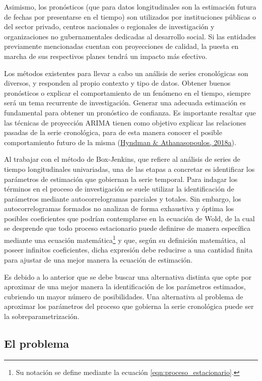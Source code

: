 \documentclass[
]{article}
\begin{document}
Asimismo, los pronósticos (que para datos longitudinales son la
estimación futura de fechas por presentarse en el tiempo) son utilizados
por instituciones públicas o del sector privado, centros nacionales o
regionales de investigación y organizaciones no gubernamentales
dedicadas al desarrollo social. Si las entidades previamente mencionadas
cuentan con proyecciones de calidad, la puesta en marcha de sus
respectivos planes tendrá un impacto más efectivo.

Los métodos existentes para llevar a cabo un análisis de series
cronológicas son diversos, y responden al propio contexto y tipo de
datos. Obtener buenos pronósticos o explicar el comportamiento de un
fenómeno en el tiempo, siempre será un tema recurrente de investigación.
Generar una adecuada estimación es fundamental para obtener un
pronóstico de confianza. Es importante resaltar que las técnicas de
proyección ARIMA tienen como objetivo explicar las relaciones pasadas de
la serie cronológica, para de esta manera conocer el posible
comportamiento futuro de la misma
(\protect\hyperlink{ref-hyndman2018forecasting}{Hyndman \&
Athanasopoulos, 2018a}).

Al trabajar con el método de Box-Jenkins, que refiere al análisis de
series de tiempo longitudinales univariadas, una de las etapas a
concretar es identificar los parámetros de estimación que gobiernan la
serie temporal. Para indagar los términos en el proceso de investigación
se suele utilizar la identificación de parámetros mediante
autocorrelogramas parciales y totales. Sin embargo, los
autocorrelogramas formados no analizan de forma exhaustiva y óptima los
posibles coeficientes que podrían contemplarse en la ecuación de Wold,
de la cual se desprende que todo proceso estacionario puede definirse de
manera específica mediante una ecuación matemática\footnote{Su notación
  se define mediante la ecuación \ref{eqn:proceso_estacionario}.} y que,
según su definición matemática, al poseer infinitos coeficientes, dicha
expresión debe reducirse a una cantidad finita para ajustar de una mejor
manera la ecuación de estimación.

Es debido a lo anterior que se debe buscar una alternativa distinta que
opte por aproximar de una mejor manera la identificación de los
parámetros estimados, cubriendo un mayor número de posibilidades. Una
alternativa al problema de aproximar los parámetros del proceso que
gobierna la serie cronológica puede ser la sobreparametrización.

\subsection{El problema}
\end{document}
